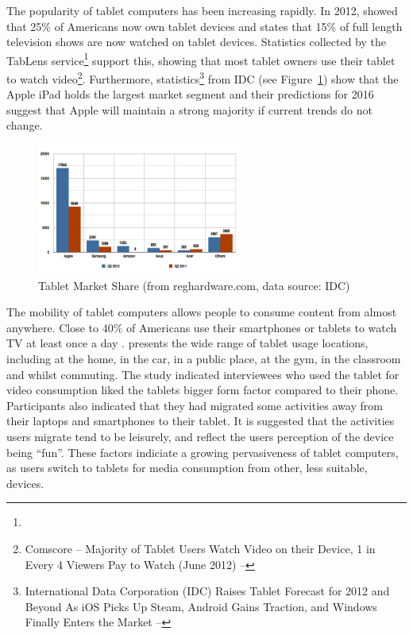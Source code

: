 	The popularity of tablet computers has been increasing rapidly. In 2012, \citet{pewResearch} showed that 25\% of Americans now own tablet devices and \citet{viacom} states that 15\% of full length television shows are now watched on tablet devices. Statistics collected by the TabLens service\footnote{} support this, showing that most tablet owners use their tablet to watch video\footnote{Comscore -- Majority of Tablet Users Watch Video on their Device, 1 in Every 4 Viewers Pay to Watch (June 2012) -- }. Furthermore, statistics\footnote{International Data Corporation (IDC) Raises Tablet Forecast for 2012 and Beyond As iOS Picks Up Steam, Android Gains Traction, and Windows Finally Enters the Market -- } from IDC (see Figure~\ref{fig:tablet_market_share}) show that the Apple iPad holds the largest market segment and their predictions for 2016 suggest that Apple will maintain a strong majority if current trends do not change.

	\begin{figure}[h]
		\centering
			\includegraphics[width=0.6\textwidth]{images/idcTabletMarketShare.png}
		\caption[Caption for LOF]{Tablet Market Share (from reghardware.com\footnotemark, data source: IDC)}
		\label{fig:tablet_market_share}
	\end{figure}

	The mobility of tablet computers allows people to consume content from almost anywhere. Close to 40\% of Americans use their smartphones or tablets to watch TV at least once a day \citep{state-of-media}. \citet{google-tablets} presents the wide range of tablet usage locations, including at the home, in the car, in a public place, at the gym, in the classroom and whilst commuting. The study indicated interviewees who used the tablet for video consumption liked the tablets bigger form factor compared to their phone. Participants also indicated that they had migrated some activities away from their laptops and smartphones to their tablet. It is suggested that the activities users migrate tend to be leisurely, and reflect the users perception of the device being ``fun''. These factors indiciate a growing pervasiveness of tablet computers, as users switch to tablets for media consumption from other, less suitable, devices.

